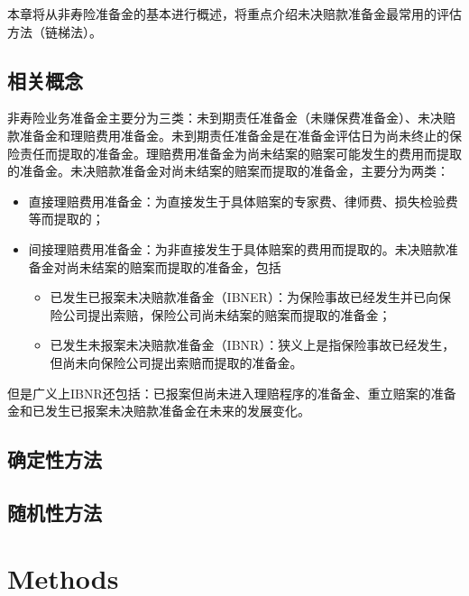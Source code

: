 \documentclass[
]{book}
\begin{document}
本章将从非寿险准备金的基本进行概述，将重点介绍未决赔款准备金最常用的评估方法（链梯法）。

\hypertarget{ux76f8ux5173ux6982ux5ff5-1}{%
\section{相关概念}\label{ux76f8ux5173ux6982ux5ff5-1}}

非寿险业务准备金主要分为三类：未到期责任准备金（未赚保费准备金）、未决赔款准备金和理赔费用准备金。未到期责任准备金是在准备金评估日为尚未终止的保险责任而提取的准备金。理赔费用准备金为尚未结案的赔案可能发生的费用而提取的准备金。未决赔款准备金对尚未结案的赔案而提取的准备金，主要分为两类：

\begin{itemize}
\item
  直接理赔费用准备金：为直接发生于具体赔案的专家费、律师费、损失检验费等而提取的；
\item
  间接理赔费用准备金：为非直接发生于具体赔案的费用而提取的。未决赔款准备金对尚未结案的赔案而提取的准备金，包括

  \begin{itemize}
  \item
    已发生已报案未决赔款准备金（IBNER）：为保险事故已经发生并已向保险公司提出索赔，保险公司尚未结案的赔案而提取的准备金；
  \item
    已发生未报案未决赔款准备金（IBNR）：狭义上是指保险事故已经发生，但尚未向保险公司提出索赔而提取的准备金。
  \end{itemize}
\end{itemize}

但是广义上IBNR还包括：已报案但尚未进入理赔程序的准备金、重立赔案的准备金和已发生已报案未决赔款准备金在未来的发展变化。

\hypertarget{ux786eux5b9aux6027ux65b9ux6cd5}{%
\section{确定性方法}\label{ux786eux5b9aux6027ux65b9ux6cd5}}

\hypertarget{ux968fux673aux6027ux65b9ux6cd5}{%
\section{随机性方法}\label{ux968fux673aux6027ux65b9ux6cd5}}

\hypertarget{methods}{%
\chapter{Methods}\label{methods}}
\end{document}
